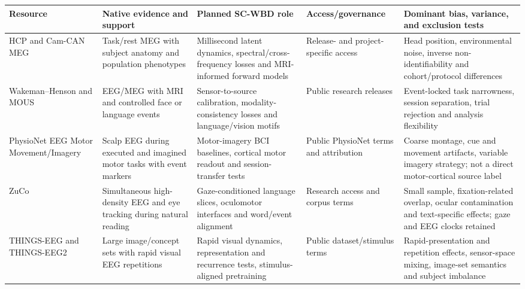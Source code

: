 \clearpage
\begin{table}[!h]
\centering
\footnotesize
\setlength{\tabcolsep}{3pt}
\renewcommand{\arraystretch}{1.08}
\begin{tabularx}{\textwidth}{@{}p{}p{}p{}p{}X@{}}
\toprule
\textbf{Resource} & \textbf{Native evidence and support} &
\textbf{Planned SC-WBD role} & \textbf{Access/governance} &
\textbf{Dominant bias, variance, and exclusion tests}\\
\midrule
HCP and Cam-CAN MEG \citep{vanessen2013,taylor2017camcan} &
Task/rest MEG with subject anatomy and population phenotypes &
Millisecond latent dynamics, spectral/cross-frequency losses and MRI-informed
forward models &
Release- and project-specific access &
Head position, environmental noise, inverse non-identifiability and
cohort/protocol differences\\

Wakeman--Henson and MOUS \citep{wakeman2015,schoffelen2019mous} &
EEG/MEG with MRI and controlled face or language events &
Sensor-to-source calibration, modality-consistency losses and language/vision
motifs &
Public research releases &
Event-locked task narrowness, session separation, trial rejection and
analysis flexibility\\

PhysioNet EEG Motor Movement/Imagery &
Scalp EEG during executed and imagined motor tasks with event markers &
Motor-imagery BCI baselines, cortical motor readout and session-transfer
tests &
Public PhysioNet terms and attribution &
Coarse montage, cue and movement artifacts, variable imagery strategy; not a
direct motor-cortical source label\\

ZuCo \citep{hollenstein2018zuco} &
Simultaneous high-density EEG and eye tracking during natural reading &
Gaze-conditioned language slices, oculomotor interfaces and word/event
alignment &
Research access and corpus terms &
Small sample, fixation-related overlap, ocular contamination and
text-specific effects; gaze and EEG clocks retained\\

THINGS-EEG and THINGS-EEG2
\citep{grootswagers2022things,gifford2022things2} &
Large image/concept sets with rapid visual EEG repetitions &
Rapid visual dynamics, representation and recurrence tests,
stimulus-aligned pretraining &
Public dataset/stimulus terms &
Rapid-presentation and repetition effects, sensor-space mixing, image-set
semantics and subject imbalance\\


\end{tabularx}
\end{table}

